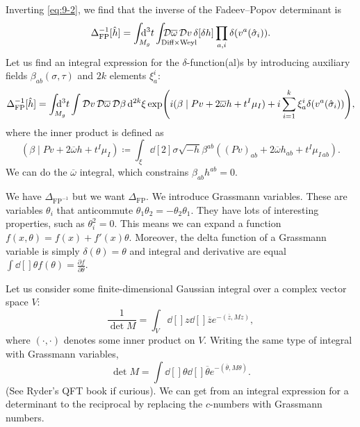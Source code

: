 Inverting \eqref{eq:9-2}, we find that the inverse of the Fadeev--Popov determinant is
\begin{equation}
  \Delta_{\text{FP}}^{-1}[\hat{h}] = \int_{\mathrlap{M_g}} \dd[3]{t} \int_{\mathrlap{\text{Diff} \times \text{Weyl}}} \pdd{\overline{\omega}{}} \pdd{v} \delta[\delta h ] \prod_{a, i} \delta(v^a(\hat{\sigma}_i)).
\end{equation}
Let us find an integral expression for the $\delta$-function(al)s by introducing auxiliary fields $\beta_{ab}(\sigma, \tau)$ and $2k$ elements $\xi^i_a$:
\begin{equation}
  \Delta^{-1}_{\text{FP}}[\hat{h}] =\int_{\mathrlap{M_g}} \dd[3]{t} \int \pdd{v} \pdd{\overline{\omega}{}} \pdd{\beta} \dd[2k]{{\xi}} \exp(i (\beta \mid Pv + 2 \overline{\omega}{} h + t^I \mu_I) + i \sum_{i=1}^{k} \xi^i_a \delta(v^a(\hat{\sigma}_i))),
\end{equation}
where the inner product is defined as
\begin{equation}
  (\beta \mid Pv + 2 \overline{\omega}{} h + t^I \mu_I) \coloneqq \int_\xi \dd[2]{\sigma} \sqrt{-h} \beta^{ab} ((Pv)_{ab} + 2 \overline{\omega}{} h_{ab} + t^I \mu_{I\, ab}).
\end{equation}
We can do the $\overline{\omega}{}$ integral, which constrains $\beta_{ab} h^{ab} = 0$.

\begin{leftbar}
  We have $\Delta_{\text{FP}^{-1}}$ but we want $\Delta_{\text{FP}}$.
  We introduce Grassmann variables. These are variables $\theta_i$ that anticommute $\theta_1 \theta_2 = - \theta_2 \theta_1$. They have lots of interesting properties, such as $\theta^2_i = 0$.
  This means we can expand a function $f(x, \theta) = f(x) + f'(x) \theta$. 
  Moreover, the delta function of a Grassmann variable is simply $\delta(\theta) = \theta$ and integral and derivative are equal $\int \dd[]{\theta} f(\theta) = \frac{\partial f}{\partial \theta}$.
\end{leftbar}

Let us consider some finite-dimensional Gaussian integral over a complex vector space $V$:
\begin{equation}
  \frac{1}{\det M} = \int_V \dd[]{z} \dd[]{\overline{z}{}} e^{-(\overline{z}{}, Mz)},
\end{equation}
where $(\cdot, \cdot)$ denotes some inner product on $V$.
Writing the same type of integral with Grassmann variables, 
\begin{equation}
  \det M = \int \dd[]{\theta} \dd[]{\overline{\theta}{}} e^{-(\overline{\theta}{}, M \theta)}.
\end{equation}
(See Ryder's QFT book if curious).
We can get from an integral expression for a determinant to the reciprocal by replacing the $c$-numbers with Grassmann numbers.

